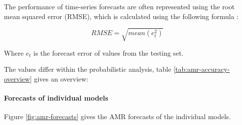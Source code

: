 \documentclass[
]{article}
\begin{document}
The performance of time-series forecasts are often represented using the root mean squared error (RMSE), which is calculated using the following formula \autocite{hyndmanForecastingPrinciplesPractice2021}:

\[
RMSE = \sqrt{mean(e^2_t)}
\]

Where \(e_t\) is the forecast error of values from the testing set.

The values differ within the probabilistic analysis, table \ref{tab:amr-accuracy-overview} gives an overview:

\begin{table}[!h]

\caption{\label{tab:amr-accuracy-overview}Overview accuracy metrics AMR predictions}
\centering
{}
\end{table}

\hypertarget{forecasts-of-individual-models}{%
\paragraph{Forecasts of individual models}\label{forecasts-of-individual-models}}

Figure \ref{fig:amr-forecasts} gives the AMR forecasts of the individual models.
\end{document}
